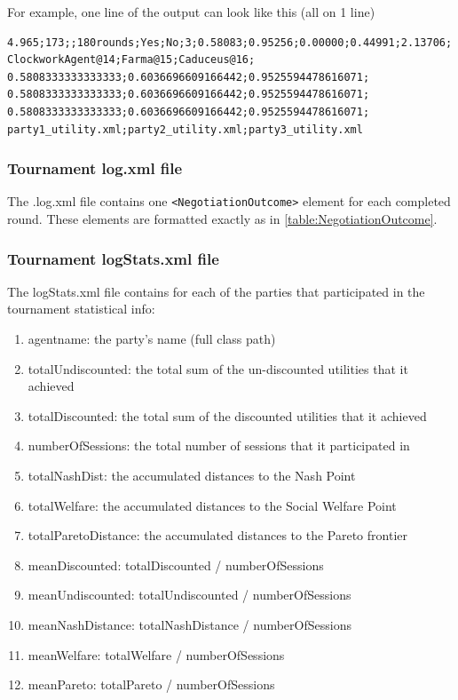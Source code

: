\documentclass[]{article}
\begin{document}
For example, one line of the output can look like this (all on 1 line)

\begin{verbatim}
4.965;173;;180rounds;Yes;No;3;0.58083;0.95256;0.00000;0.44991;2.13706;
ClockworkAgent@14;Farma@15;Caduceus@16;
0.5808333333333333;0.6036696609166442;0.9525594478616071;
0.5808333333333333;0.6036696609166442;0.9525594478616071;
0.5808333333333333;0.6036696609166442;0.9525594478616071;
party1_utility.xml;party2_utility.xml;party3_utility.xml
\end{verbatim}

\subsubsection{Tournament log.xml file}

The .log.xml file contains one \verb|<NegotiationOutcome>| element for each completed round.
These elements are formatted exactly as in \ref{table:NegotiationOutcome}.

\subsubsection{Tournament logStats.xml file}
The logStats.xml file contains for each of the parties that participated in the tournament statistical info:

\begin{enumerate}
\item agentname: the party's name (full class path)
\item totalUndiscounted: the total sum of the un-discounted utilities that it achieved
\item totalDiscounted: the total sum of the discounted utilities that it achieved
\item numberOfSessions: the total number of sessions that it participated in
\item totalNashDist: the accumulated distances to the Nash Point
\item totalWelfare: the accumulated distances to the Social Welfare Point
\item totalParetoDistance: the accumulated distances to the Pareto frontier
\item meanDiscounted: totalDiscounted /  numberOfSessions
\item meanUndiscounted: totalUndiscounted /  numberOfSessions
\item meanNashDistance: totalNashDistance /  numberOfSessions
\item meanWelfare: totalWelfare /  numberOfSessions
\item meanPareto: totalPareto /  numberOfSessions
\end{enumerate}
\end{document}
